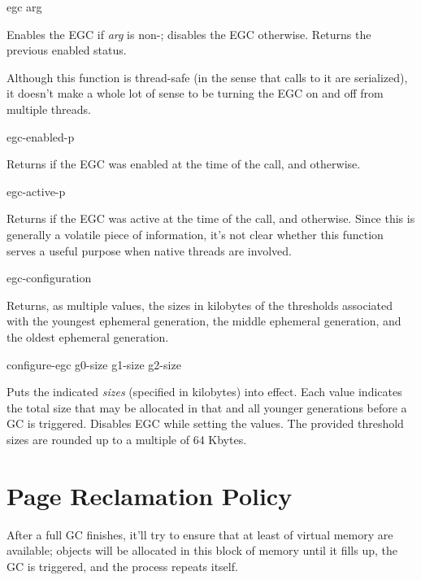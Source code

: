 \begin{defun}[Function]
egc arg

Enables the EGC if {\it arg} is non-; disables the EGC otherwise.
Returns the previous enabled status.

Although this function is thread-safe (in the sense that calls to it
are serialized), it doesn't make a whole lot of sense to be turning
the EGC on and off from multiple threads.
\end{defun}

\begin{defun}[Function]
egc-enabled-p

Returns  if the EGC was enabled at the time of the call, and
 otherwise.
\end{defun}

\begin{defun}[Function]
egc-active-p

Returns  if the EGC was active at the time of the call, and
 otherwise. Since this is generally a volatile piece of
information, it's not clear whether this function serves a useful
purpose when native threads are involved.
\end{defun}

\begin{defun}[Function]
egc-configuration

Returns, as multiple values, the sizes in kilobytes of the thresholds
associated with the youngest ephemeral generation, the middle
ephemeral generation, and the oldest ephemeral generation.
\end{defun}

\begin{defun}[Function]
configure-egc g0-size g1-size g2-size

Puts the indicated {\it sizes} (specified in kilobytes) into effect.
Each value indicates the total size that may be allocated in that and
all younger generations before a GC is triggered.  Disables EGC while
setting the values.  The provided threshold sizes are rounded up to a
multiple of 64 Kbytes.
\end{defun}

\section{Page Reclamation Policy}

After a full GC finishes, it'll try to ensure that at least
 of virtual memory are available; objects will
be allocated in this block of memory until it fills up, the GC is
triggered, and the process repeats itself.

